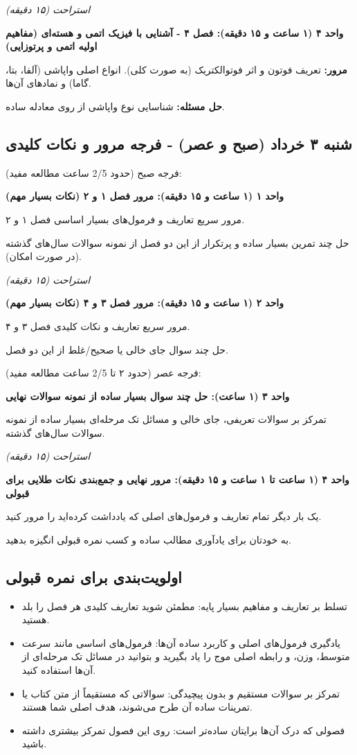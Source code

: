 \documentclass[12pt]{article}
\newcommand{\unithead}[1]{\par\vspace{1ex}\noindent\textbf{#1}\par\nopagebreak[4]\vspace{0.5ex}}
\newcommand{\休息}[1]{\par\centering\textit{#1}\par\vspace{1ex}} %
\begin{document}
\休息{استراحت (۱۵ دقیقه)}

\unithead{واحد ۴ (۱ ساعت و ۱۵ دقیقه): فصل ۴ - آشنایی با فیزیک اتمی و هسته‌ای (مفاهیم اولیه اتمی و پرتوزایی)}
\noindent\textbf{مرور: }تعریف فوتون و اثر فوتوالکتریک (به صورت کلی). انواع اصلی واپاشی (آلفا، بتا، گاما) و نمادهای آن‌ها.
\par\noindent\textbf{حل مسئله: }شناسایی نوع واپاشی از روی معادله ساده.

\subsection*{شنبه ۳ خرداد (صبح و عصر) - فرجه مرور و نکات کلیدی}
فرجه صبح (حدود 2/5 ساعت مطالعه مفید):

\unithead{واحد ۱ (۱ ساعت و ۱۵ دقیقه): مرور فصل ۱ و ۲ (نکات بسیار مهم)}
مرور سریع تعاریف و فرمول‌های بسیار اساسی فصل ۱ و ۲.
\par حل چند تمرین بسیار ساده و پرتکرار از این دو فصل از نمونه سوالات سال‌های گذشته (در صورت امکان).

\休息{استراحت (۱۵ دقیقه)}

\unithead{واحد ۲ (۱ ساعت و ۱۵ دقیقه): مرور فصل ۳ و ۴ (نکات بسیار مهم)}
مرور سریع تعاریف و نکات کلیدی فصل ۳ و ۴.
\par حل چند سوال جای خالی یا صحیح/غلط از این دو فصل.

\vspace{1em}
فرجه عصر (حدود ۲ تا 2/5 ساعت مطالعه مفید):

\unithead{واحد ۳ (۱ ساعت): حل چند سوال بسیار ساده از نمونه سوالات نهایی}
تمرکز بر سوالات تعریفی، جای خالی و مسائل تک مرحله‌ای بسیار ساده از نمونه سوالات سال‌های گذشته.

\休息{استراحت (۱۵ دقیقه)}

\unithead{واحد ۴ (۱ ساعت تا ۱ ساعت و ۱۵ دقیقه): مرور نهایی و جمع‌بندی نکات طلایی برای قبولی}
یک بار دیگر تمام تعاریف و فرمول‌های اصلی که یادداشت کرده‌اید را مرور کنید.
\par به خودتان برای یادآوری مطالب ساده و کسب نمره قبولی انگیزه بدهید.

\subsection*{اولویت‌بندی برای نمره قبولی}
\begin{itemize}
    \item تسلط بر تعاریف و مفاهیم بسیار پایه: مطمئن شوید تعاریف کلیدی هر فصل را بلد هستید.
    \item یادگیری فرمول‌های اصلی و کاربرد ساده آن‌ها: فرمول‌های اساسی مانند سرعت متوسط، وزن، و رابطه اصلی موج را یاد بگیرید و بتوانید در مسائل تک مرحله‌ای از آن‌ها استفاده کنید.
    \item تمرکز بر سوالات مستقیم و بدون پیچیدگی: سوالاتی که مستقیماً از متن کتاب یا تمرینات ساده آن طرح می‌شوند، هدف اصلی شما هستند.
    \item فصولی که درک آن‌ها برایتان ساده‌تر است: روی این فصول تمرکز بیشتری داشته باشید.
\end{itemize}
\end{document}
